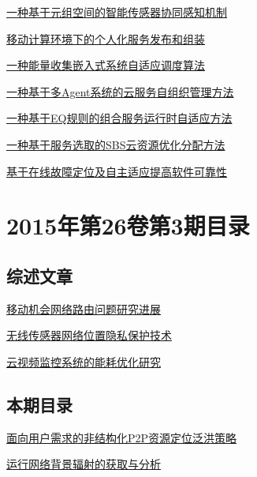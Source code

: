 \documentclass[a4paper]{article}
\begin{document}
\href{http://www.jos.org.cn/ch/reader/download_pdf.aspx?file_no=4753&year_id=2015&quarter_id=4&falg=1}{一种基于元组空间的智能传感器协同感知机制}

\href{http://www.jos.org.cn/ch/reader/download_pdf.aspx?file_no=4754&year_id=2015&quarter_id=4&falg=1}{移动计算环境下的个人化服务发布和组装}

\href{http://www.jos.org.cn/ch/reader/download_pdf.aspx?file_no=4752&year_id=2015&quarter_id=4&falg=1}{一种能量收集嵌入式系统自适应调度算法}

\href{http://www.jos.org.cn/ch/reader/download_pdf.aspx?file_no=4760&year_id=2015&quarter_id=4&falg=1}{一种基于多Agent系统的云服务自组织管理方法}

\href{http://www.jos.org.cn/ch/reader/download_pdf.aspx?file_no=4750&year_id=2015&quarter_id=4&falg=1}{一种基于EQ规则的组合服务运行时自适应方法}

\href{http://www.jos.org.cn/ch/reader/download_pdf.aspx?file_no=4756&year_id=2015&quarter_id=4&falg=1}{一种基于服务选取的SBS云资源优化分配方法}

\href{http://www.jos.org.cn/ch/reader/download_pdf.aspx?file_no=4761&year_id=2015&quarter_id=4&falg=1}{基于在线故障定位及自主适应提高软件可靠性}


\section{\textbf{2015年第26卷第3期目录}}
\subsection{综述文章}
\href{http://www.jos.org.cn/ch/reader/download_pdf.aspx?file_no=4741&year_id=2015&quarter_id=3&falg=1}{移动机会网络路由问题研究进展}

\href{http://www.jos.org.cn/ch/reader/download_pdf.aspx?file_no=4715&year_id=2015&quarter_id=3&falg=1}{无线传感器网络位置隐私保护技术}

\href{http://www.jos.org.cn/ch/reader/download_pdf.aspx?file_no=4763&year_id=2015&quarter_id=3&falg=1}{云视频监控系统的能耗优化研究}

\subsection{本期目录}
\href{http://www.jos.org.cn/ch/reader/download_pdf.aspx?file_no=4595&year_id=2015&quarter_id=3&falg=1}{面向用户需求的非结构化P2P资源定位泛洪策略}

\href{http://www.jos.org.cn/ch/reader/download_pdf.aspx?file_no=4516&year_id=2015&quarter_id=3&falg=1}{运行网络背景辐射的获取与分析}
\end{document}
